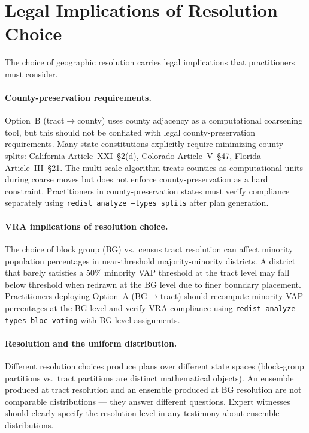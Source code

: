 \section{Legal Implications of Resolution Choice}
\label{sec:legal}

The choice of geographic resolution carries legal implications that practitioners must consider.

\paragraph{County-preservation requirements.}
Option~B (tract$\to$county) uses county adjacency as a computational coarsening tool,
but this should not be conflated with legal county-preservation requirements.
Many state constitutions explicitly require minimizing county splits:
California Article~XXI~\S2(d), Colorado Article~V~\S47, Florida Article~III~\S21.
The multi-scale algorithm treats counties as computational units during coarse moves
but does not enforce county-preservation as a hard constraint.
Practitioners in county-preservation states must verify compliance separately using
\texttt{redist analyze --types splits} after plan generation.

\paragraph{VRA implications of resolution choice.}
The choice of block group (BG) vs.\ census tract resolution can affect minority
population percentages in near-threshold majority-minority districts.
A district that barely satisfies a 50\% minority VAP threshold at the tract level
may fall below threshold when redrawn at the BG level due to finer boundary placement.
Practitioners deploying Option~A (BG$\to$tract) should recompute minority VAP
percentages at the BG level and verify VRA compliance using
\texttt{redist analyze --types bloc-voting} with BG-level assignments.

\paragraph{Resolution and the uniform distribution.}
Different resolution choices produce plans over different state spaces
(block-group partitions vs.\ tract partitions are distinct mathematical objects).
An ensemble produced at tract resolution and an ensemble produced at BG resolution
are not comparable distributions --- they answer different questions.
Expert witnesses should clearly specify the resolution level in any testimony
about ensemble distributions.
